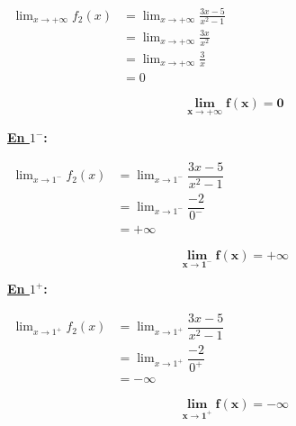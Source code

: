 \documentclass[12pt,a4paper]{article}
\begin{document}
\begin{enumerate}
		\(
		\begin{aligned}
				\lim_{x\to +\infty} f_{2}(x)&=\lim_{x\to +\infty}\frac{3x-5}{x^{2}-1}\\
																		&=\lim_{x\to +\infty}\frac{3x}{x^{2}}\\
																		&=\lim_{x\to +\infty}\frac{3}{x}\\
																		&=0
		\end{aligned}
		\)		

    \begin{resultbox}
    \[
    \mathbf{\lim_{x\to +\infty}f(x) = 0}
    \]
		\end{resultbox}	

		\begin{center}
\end{center}		
		
		\textbf{\underline{En $1^{-}$}:}

		\(
		\begin{aligned}
				\lim_{x\to 1^{-}} f_{2}(x)&=\lim_{x\to 1^{-}}\dfrac{3x-5}{x^{2}-1}\\
																	&=\lim_{x\to 1^{-}}\dfrac{-2}{0^{-}}\\
																	&=+\infty
		\end{aligned}
		\)		

    \begin{resultbox}
    \[
    \mathbf{\lim_{x\to 1^{-}}f(x) = +\infty}
    \]
		\end{resultbox}		
		
		\textbf{\underline{En $1^{+}$}:}   

		\(
		\begin{aligned}
					\lim_{x\to 1^{+}} f_{2}(x)&=\lim_{x\to 1^{+}}\dfrac{3x-5}{x^{2}-1}\\
																		&=\lim_{x\to 1^{+}}\dfrac{-2}{0^{+}}\\
																		&=-\infty
		\end{aligned}
		\)    
    
    \begin{resultbox}
    \[
    \mathbf{\lim_{x\to 1^{+}}f(x) = -\infty}
    \]
		\end{resultbox}    
    
    

\end{enumerate}
\end{document}
